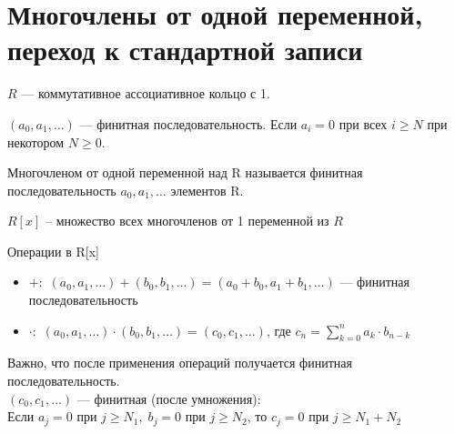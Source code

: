 
\section{Многочлены от одной переменной, переход к стандартной записи}
\begin{normalsize}
$R$ --- коммутативное ассоциативное кольцо с 1.

\begin{conj} 
    $(a_0, a_1, \dots)$ --- финитная последовательность.
    Если $a_i = 0$ при всех $i \geqslant N$ при некотором
    $N \geqslant 0$.
\end{conj}

\begin{conj} 
    Многочленом от одной переменной над R называется финитная 
    последовательность $a_0, a_1,\dots$ элементов R.
\end{conj}

$R[x]$ -- множество всех многочленов от 1 переменной из $R$

\begin{theorem-non} Операции в R[x] \end{theorem-non}
    \begin{itemize}
        \item[] $+:$ $(a_0,a_1,\dots) + (b_0, b_1,\dots) = (a_0 + b_0, a_1 + b_1, \dots)$ --- финитная последовательность
        \item[] $\cdot:$ $(a_0,a_1,\dots) \cdot (b_0, b_1,\dots) = (c_0, c_1, \dots)$, где $c_n = \sum_{k=0}^{n} a_k \cdot b_{n-k}$  
    \end{itemize}

\notice Важно, что после применения операций 
получается финитная последовательность. \\
$(c_0, c_1, \dots)$ --- финитная (после умножения): \\
Если $a_j = 0$ при $j \geqslant N_1,\; b_j = 0$ при $j \geqslant N_2$,
то $c_j = 0$ при $j \geqslant N_1 + N_2$


\end{normalsize}
